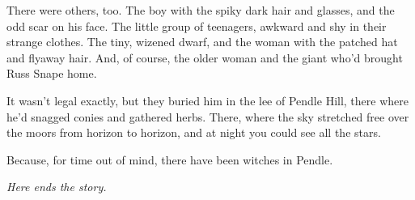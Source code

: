 There were others, too. The boy with the spiky dark hair and glasses, and the odd scar on his face. The little group of teenagers, awkward and shy in their strange clothes. The tiny, wizened dwarf, and the woman with the patched hat and flyaway hair. And, of course, the older woman and the giant who'd brought Russ Snape home.

It wasn't legal exactly, but they buried him in the lee of Pendle Hill, there where he'd snagged conies and gathered herbs. There, where the sky stretched free over the moors from horizon to horizon, and at night you could see all the stars.

Because, for time out of mind, there have been witches in Pendle.

\sbreak

\begin{center}\emph{Here ends the story.}\end{center}
